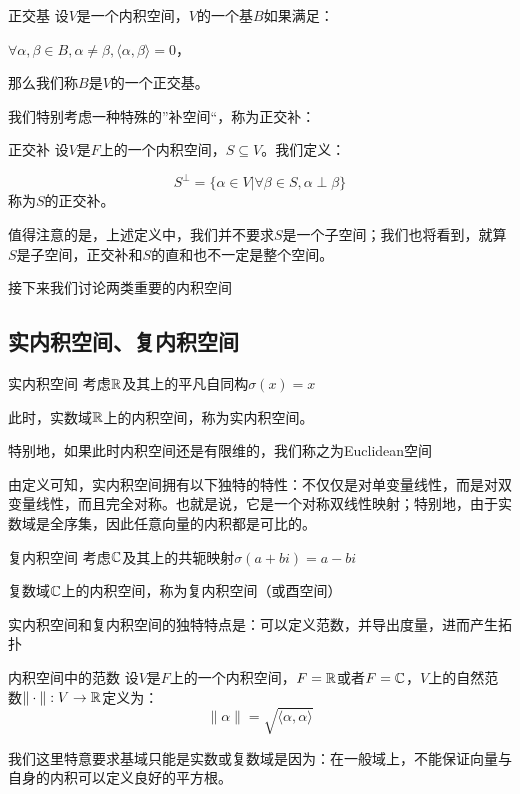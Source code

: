 \documentclass[12pt, a4paper, oneside, UTF8]{ctexbook}
\begin{document}
			\begin{defn}{正交基}{}
				设$V$是一个内积空间，$V$的一个基$B$如果满足：

				$\forall \alpha ,\beta \in B,\alpha \neq \beta ,\langle \alpha ,\beta \rangle =0$，
				
				那么我们称$B$是$V$的一个正交基。
			\end{defn}
			我们特别考虑一种特殊的”补空间“，称为正交补：
			\begin{defn}{正交补}{}
				设$V$是$F$上的一个内积空间，$S \subseteq V$。我们定义：

				\begin{equation}
					S^{\perp}=\{\alpha \in V | \forall \beta \in S,\alpha \perp \beta \}
				\end{equation}
				称为$S$的正交补。
			\end{defn}
			值得注意的是，上述定义中，我们并不要求$S$是一个子空间；我们也将看到，就算$S$是子空间，正交补和$S$的直和也不一定是整个空间。

			接下来我们讨论两类重要的内积空间
		\subsection{实内积空间、复内积空间}
			\begin{defn}{实内积空间}{}
				考虑$\mathbb{R}$及其上的平凡自同构$\sigma(x)=x$

				此时，实数域$\mathbb{R}$上的内积空间，称为实内积空间。

				特别地，如果此时内积空间还是有限维的，我们称之为Euclidean空间
			\end{defn}
			由定义可知，实内积空间拥有以下独特的特性：不仅仅是对单变量线性，而是对双变量线性，而且完全对称。也就是说，它是一个对称双线性映射；特别地，由于实数域是全序集，因此任意向量的内积都是可比的。
			\begin{defn}{复内积空间}{}
				考虑$\mathbb{C}$及其上的共轭映射$\sigma(a+bi)=a-bi$

				复数域$\mathbb{C}$上的内积空间，称为复内积空间（或酉空间）
			\end{defn}
			实内积空间和复内积空间的独特特点是：可以定义范数，并导出度量，进而产生拓扑
			\begin{defn}{内积空间中的范数}{}
				设$V$是$F$上的一个内积空间，$F=\mathbb{R}$或者$F=\mathbb{C}$，$V$上的自然范数$\|\cdot \|:V \to \mathbb{R}$定义为：
				\begin{equation}
					\|\alpha \|=\sqrt{\langle \alpha ,\alpha \rangle }
				\end{equation}
			\end{defn}
			我们这里特意要求基域只能是实数或复数域是因为：在一般域上，不能保证向量与自身的内积可以定义良好的平方根。
			
\end{document}
